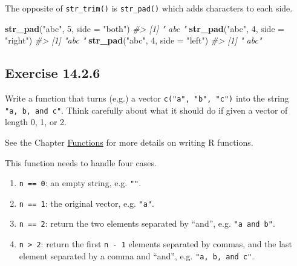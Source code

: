 \documentclass[]{book}
\newenvironment{Shaded}{\begin{snugshade}}{\end{snugshade}}
\newcommand{\CommentTok}[1]{\textcolor[rgb]{0.56,0.35,0.01}{\textit{#1}}}
\newcommand{\DataTypeTok}[1]{\textcolor[rgb]{0.13,0.29,0.53}{#1}}
\newcommand{\DecValTok}[1]{\textcolor[rgb]{0.00,0.00,0.81}{#1}}
\newcommand{\KeywordTok}[1]{\textcolor[rgb]{0.13,0.29,0.53}{\textbf{#1}}}
\newcommand{\NormalTok}[1]{#1}
\newcommand{\StringTok}[1]{\textcolor[rgb]{0.31,0.60,0.02}{#1}}
\providecommand{\tightlist}{%
  \setlength{\itemsep}{0pt}\setlength{\parskip}{0pt}}
\theoremstyle{plain}
\theoremstyle{remark}
\theoremstyle{definition}
\theoremstyle{definition}
\theoremstyle{definition}
\theoremstyle{remark}
\begin{document}
The opposite of \texttt{str\_trim()} is \texttt{str\_pad()} which adds
characters to each side.

\begin{Shaded}
\begin{Highlighting}[]
\KeywordTok{str_pad}\NormalTok{(}\StringTok{"abc"}\NormalTok{, }\DecValTok{5}\NormalTok{, }\DataTypeTok{side =} \StringTok{"both"}\NormalTok{)}
\CommentTok{#> [1] " abc "}
\KeywordTok{str_pad}\NormalTok{(}\StringTok{"abc"}\NormalTok{, }\DecValTok{4}\NormalTok{, }\DataTypeTok{side =} \StringTok{"right"}\NormalTok{)}
\CommentTok{#> [1] "abc "}
\KeywordTok{str_pad}\NormalTok{(}\StringTok{"abc"}\NormalTok{, }\DecValTok{4}\NormalTok{, }\DataTypeTok{side =} \StringTok{"left"}\NormalTok{)}
\CommentTok{#> [1] " abc"}
\end{Highlighting}
\end{Shaded}

\hypertarget{exercise-14.2.6}{%
\subsection*{\texorpdfstring{Exercise
{14.2.6}}{Exercise 14.2.6}}\label{exercise-14.2.6}}

Write a function that turns (e.g.) a vector \texttt{c("a",\ "b",\ "c")}
into the string \texttt{"a,\ b,\ and\ c"}. Think carefully about what it
should do if given a vector of length 0, 1, or 2.

See the Chapter \protect\hyperlink{functions}{Functions} for more
details on writing R functions.

This function needs to handle four cases.

\begin{enumerate}
\def\labelenumi{\arabic{enumi}.}
\tightlist
\item
  \texttt{n\ ==\ 0}: an empty string, e.g. \texttt{""}.
\item
  \texttt{n\ ==\ 1}: the original vector, e.g. \texttt{"a"}.
\item
  \texttt{n\ ==\ 2}: return the two elements separated by ``and'', e.g.
  \texttt{"a\ and\ b"}.
\item
  \texttt{n\ \textgreater{}\ 2}: return the first \texttt{n\ -\ 1}
  elements separated by commas, and the last element separated by a
  comma and ``and'', e.g. \texttt{"a,\ b,\ and\ c"}.
\end{enumerate}
\end{document}

